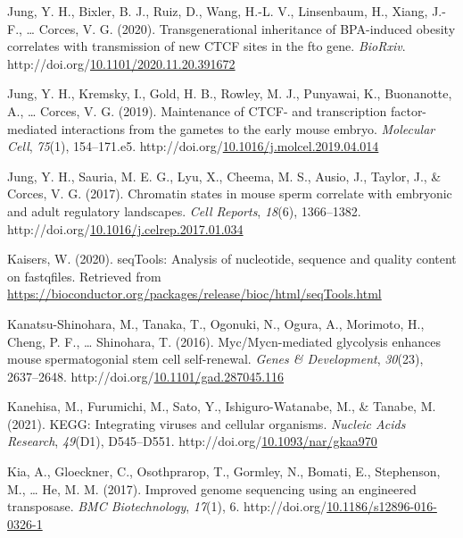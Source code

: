 \documentclass[12pt,twoside]{reedthesis}
\newlength{\cslhangindent}
\newenvironment{CSLReferences}[2] %
 {%
  \setlength{\parindent}{0pt}
  \ifodd #1 \everypar{\setlength{\hangindent}{\cslhangindent}}\ignorespaces\fi
  \ifnum #2 > 0
  \setlength{\parskip}{#2\baselineskip}
  \fi
 }%
 {}
\begin{document}
\begin{CSLReferences}{1}{0}
\leavevmode{}%
Jung, Y. H., Bixler, B. J., Ruiz, D., Wang, H.-L. V., Linsenbaum, H., Xiang, J.-F., \ldots{} Corces, V. G. (2020). Transgenerational inheritance of BPA-induced obesity correlates with transmission of new CTCF sites in the fto gene. \emph{BioRxiv}. http://doi.org/\href{https://doi.org/10.1101/2020.11.20.391672}{10.1101/2020.11.20.391672}

\leavevmode{}%
Jung, Y. H., Kremsky, I., Gold, H. B., Rowley, M. J., Punyawai, K., Buonanotte, A., \ldots{} Corces, V. G. (2019). Maintenance of CTCF- and transcription factor-mediated interactions from the gametes to the early mouse embryo. \emph{Molecular Cell}, \emph{75}(1), 154--171.e5. http://doi.org/\href{https://doi.org/10.1016/j.molcel.2019.04.014}{10.1016/j.molcel.2019.04.014}

\leavevmode{}%
Jung, Y. H., Sauria, M. E. G., Lyu, X., Cheema, M. S., Ausio, J., Taylor, J., \& Corces, V. G. (2017). Chromatin states in mouse sperm correlate with embryonic and adult regulatory landscapes. \emph{Cell Reports}, \emph{18}(6), 1366--1382. http://doi.org/\href{https://doi.org/10.1016/j.celrep.2017.01.034}{10.1016/j.celrep.2017.01.034}

\leavevmode{}%
Kaisers, W. (2020). seqTools: Analysis of nucleotide, sequence and quality content on fastqfiles. Retrieved from \url{https://bioconductor.org/packages/release/bioc/html/seqTools.html}

\leavevmode{}%
Kanatsu-Shinohara, M., Tanaka, T., Ogonuki, N., Ogura, A., Morimoto, H., Cheng, P. F., \ldots{} Shinohara, T. (2016). Myc/Mycn-mediated glycolysis enhances mouse spermatogonial stem cell self-renewal. \emph{Genes \& Development}, \emph{30}(23), 2637--2648. http://doi.org/\href{https://doi.org/10.1101/gad.287045.116}{10.1101/gad.287045.116}

\leavevmode{}%
Kanehisa, M., Furumichi, M., Sato, Y., Ishiguro-Watanabe, M., \& Tanabe, M. (2021). KEGG: Integrating viruses and cellular organisms. \emph{Nucleic Acids Research}, \emph{49}(D1), D545--D551. http://doi.org/\href{https://doi.org/10.1093/nar/gkaa970}{10.1093/nar/gkaa970}

\leavevmode{}%
Kia, A., Gloeckner, C., Osothprarop, T., Gormley, N., Bomati, E., Stephenson, M., \ldots{} He, M. M. (2017). Improved genome sequencing using an engineered transposase. \emph{BMC Biotechnology}, \emph{17}(1), 6. http://doi.org/\href{https://doi.org/10.1186/s12896-016-0326-1}{10.1186/s12896-016-0326-1}


\end{CSLReferences}
\end{document}
